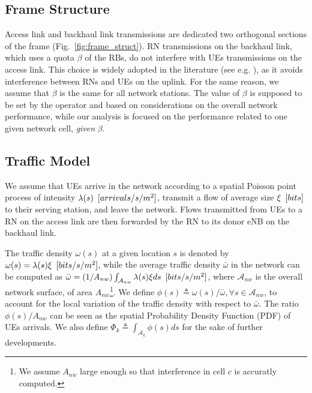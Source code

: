 \documentclass[draftcls,onecolumn]{IEEEtran}
\theoremstyle{plain}
\theoremstyle{definition}
\begin{document}
\subsection{Frame Structure}
Access link and backhaul link transmissions are dedicated two orthogonal sections of the frame (Fig.~\ref{fig:frame_struct}). RN transmissions on the backhaul link, which uses a quota $\beta$ of the RBs, do not interfere with UEs transmissions on the access link.
This choice is widely adopted in the literature (see e.g. \cite{bulakci13, Liang11}), as it avoids interference between RNs and UEs on the uplink. For the same reason, we assume that $\beta$ is the same for all network stations. The value of $\beta$ is supposed to be set by the operator and based on considerations on the overall network performance, while our analysis is focused on the performance related to one given network cell, {\it given} $\beta$. 

\subsection{Traffic Model}
We assume that UEs arrive in the network according to a spatial Poisson point process of intensity $\lambda(s)\hspace{5 pt}[arrivals/s/m^2]$, transmit a flow of average size $\xi \hspace{5 pt} [bits]$ to their serving station, and leave the network. 
Flows transmitted from UEs to a RN on the access link are then forwarded by the RN to its donor eNB on the backhaul link. 


The traffic density $\omega(s)$ at a given location $s$ is denoted by $\omega(s)=\lambda(s)\xi \hspace{5 pt}[bits/s/m^2]$, while the average traffic density $\bar{\omega}$ in the network can be computed as  $\bar{\omega}=(1/A_{nw})\int_{\mathcal{A}_{nw}} \lambda(s)\xi {ds}\hspace{5 pt}[bits/s/m^2]$, where $\mathcal{A}_{nw}$ is the overall network surface, of area $A_{nw}$\footnote{We assume $A_{nw}$ large enough so that interference in cell $c$ is accuratly computed.}. We define $\phi(s)\triangleq\omega(s)/\bar{\omega},\forall s \in \mathcal{A}_{nw}$, to account for the local variation of the traffic density with respect to $\bar{\omega}$. 
The ratio $\phi(s)/A_{nw}$ can be seen as the spatial Probability Density Function (PDF) of UEs arrivals. We also define $\Phi_k\triangleq \int_{\mathcal{A}_k}\phi(s){ds}$ for the sake of further developments.
\end{document}
